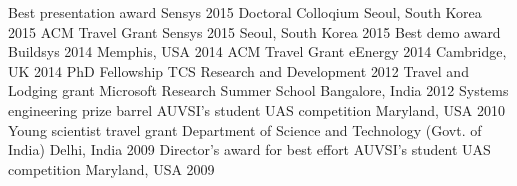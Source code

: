 
\begin{cvhonors}
  \cvhonor
    {Best presentation award}
    {Sensys 2015 Doctoral Colloqium}
    {Seoul, South Korea}
    {2015}
  \cvhonor
    {ACM Travel Grant}
    {Sensys 2015}
    {Seoul, South Korea}
    {2015}
  \cvhonor
    {Best demo award}
    {Buildsys 2014}
    {Memphis, USA}
    {2014}
  \cvhonor
    {ACM Travel Grant}
    {eEnergy 2014}
    {Cambridge, UK}
    {2014}
  \cvhonor
    {PhD Fellowship}
    {TCS Research and Development}
    {}
    {2012}
  \cvhonor
    {Travel and Lodging grant}
    {Microsoft Research Summer School}
    {Bangalore, India}
    {2012}
  \cvhonor
  {Systems engineering prize barrel}
  {AUVSI's student UAS competition}
  {Maryland, USA}
  {2010}
   \cvhonor
   {Young scientist travel grant}
   {Department of Science and Technology (Govt. of India) }
   {Delhi, India}
   {2009}
     \cvhonor
     {Director’s award for best effort}
     {AUVSI's student UAS competition }
   {Maryland, USA}
   {2009}
\end{cvhonors}
